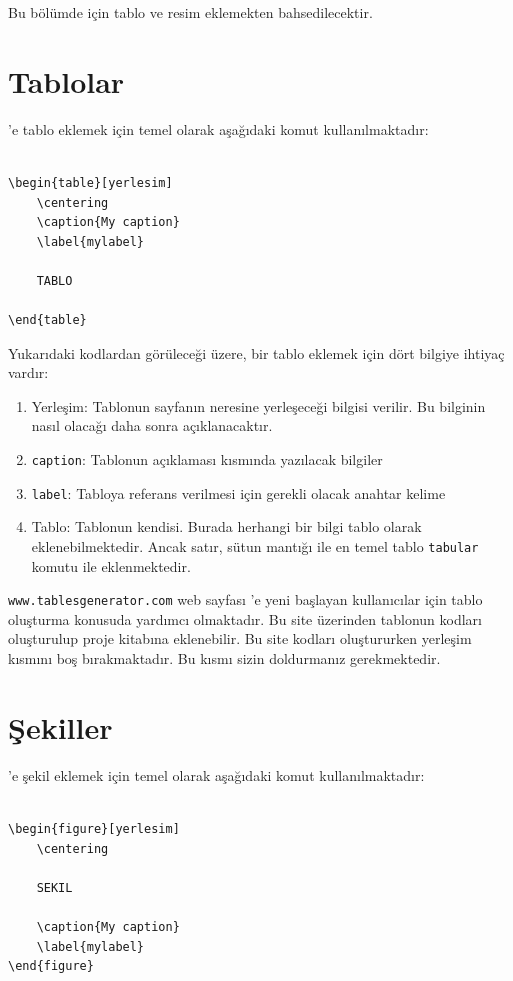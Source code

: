 Bu bölümde \latex için tablo ve resim eklemekten bahsedilecektir.

\section{Tablolar}
\latexx'e tablo eklemek için temel olarak aşağıdaki komut kullanılmaktadır:

\begin{verbatim}

\begin{table}[yerlesim]
    \centering
    \caption{My caption}
    \label{mylabel}
    
    TABLO

\end{table}

\end{verbatim}

Yukarıdaki kodlardan görüleceği üzere, bir tablo eklemek için dört bilgiye ihtiyaç vardır: 

\begin{enumerate}
    \item Yerleşim: Tablonun sayfanın neresine yerleşeceği bilgisi verilir. Bu bilginin nasıl olacağı daha sonra açıklanacaktır.
    \item \texttt{caption}: Tablonun açıklaması kısmında yazılacak bilgiler
    \item \texttt{label}: Tabloya referans verilmesi için gerekli olacak anahtar kelime
    \item Tablo: Tablonun kendisi. Burada herhangi bir bilgi tablo olarak eklenebilmektedir. Ancak satır, sütun mantığı ile en temel tablo \texttt{tabular} komutu ile eklenmektedir.
\end{enumerate}

\texttt{www.tablesgenerator.com} web sayfası \latexx'e yeni başlayan kullanıcılar için tablo oluşturma konusuda yardımcı olmaktadır. Bu site üzerinden tablonun kodları oluşturulup proje kitabına eklenebilir. Bu site kodları oluştururken yerleşim kısmını boş bırakmaktadır. Bu kısmı sizin doldurmanız gerekmektedir.

\section{Şekiller}
\latexx'e şekil eklemek için temel olarak aşağıdaki komut kullanılmaktadır:

\begin{verbatim}

\begin{figure}[yerlesim]
    \centering
    
    SEKIL

    \caption{My caption}
    \label{mylabel}
\end{figure}

\end{verbatim}

